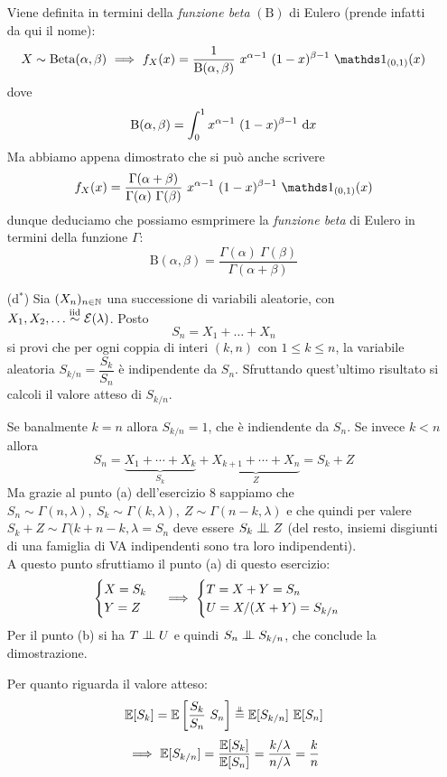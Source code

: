 \begin{enumerate}
\begin{oss}
Viene definita in termini della \emph{funzione beta} $(\mathrm{B})$ di Eulero (prende infatti da qui il nome):
\[
X\sim\text{Beta}(\alpha,\beta)\SE f_X(x)=\frac{1}{\mathrm{B}(\alpha,\beta)}\ x^{\alpha-1}\ (1-x)^{\beta-1}\ \Ind_{(0,1)}(x)
\]
dove
\[
\mathrm{B}(\alpha,\beta)=\int_0^1 x^{\alpha-1}\ (1-x)^{\beta-1}\dx
\]
Ma abbiamo appena dimostrato che si può anche scrivere
\[
f_X(x)=\frac{\Gamma(\alpha+\beta)}{\Gamma(\alpha)\ \Gamma(\beta)}\ x^{\alpha-1}\ (1-x)^{\beta-1}\ \Ind_{(0,1)}(x)
\]
dunque deduciamo che possiamo esmprimere la \emph{funzione beta} di Eulero in termini della funzione $\Gamma$:
\[
\mathrm{B}(\alpha,\beta)=\frac{\Gamma(\alpha)\ \Gamma(\beta)}{\Gamma(\alpha+\beta)}
\]
\end{oss}

\item [(d$^\ast$)] Sia $(X_n)_{n\in\mathbb{N}}$ una successione di variabili aleatorie, con $X_1,X_2,\dots\stackrel{\mathrm{iid}}{\sim}\mathcal{E}(\lambda)$. Posto
\[
S_n=X_1+\dots+X_n
\]
si provi che per ogni coppia di interi $(k,n)$ con $1\leq k\leq n$, la variabile aleatoria $S_{k/n}=\dfrac{S_k}{S_n}$ è indipendente da $S_n$. Sfruttando quest'ultimo risultato si calcoli il valore atteso di $S_{k/n}$.

Se banalmente $k=n$ allora $S_{k/n}=1$, che è indiendente da $S_{n}$. Se invece $k<n$ allora 
\[
S_n=\underbrace{X_1+\cdots+X_k}_{S_k}+\underbrace{X_{k+1}+\cdots+X_n}_{Z}=S_k+Z
\]
Ma grazie al punto (a) dell'esercizio 8 sappiamo che $S_n\sim\Gamma(n,\lambda),\ S_k\sim\Gamma(k,\lambda),\ Z\sim\Gamma(n-k,\lambda)$ e che quindi per valere $S_k+Z\sim\Gamma(k+n-k,\lambda=S_n$ deve essere $S_k\indep Z$ (del resto, insiemi disgiunti di una famiglia di VA indipendenti sono tra loro indipendenti). \\
A questo punto sfruttiamo il punto (a) di questo esercizio:
\[
\begin{cases}
X=S_k \\
Y=Z
\end{cases}
\ \Longrightarrow\ 
\begin{cases}
T=X+Y=S_n \\
U=X/(X+Y)=S_{k/n}
\end{cases}
\]
Per il punto (b) si ha $T\indep U$ e quindi $S_n\indep S_{k/n}$, che conclude la dimostrazione.

Per quanto riguarda il valore atteso:
\[
\EE[S_k]=\EE\left[\frac{S_k}{S_n}\ S_n   \right]\overset{\underset{\indep}{}}{=}\EE[S_{k/n}]\ \EE[S_n]
\]
\[
\ \Longrightarrow\  \mathbb{E}[S_{k/n}]=\frac{\mathbb{E}[S_k]}{\mathbb{E}[S_n]}=\frac{k/\lambda}{n/\lambda}=\frac{k}{n}
\]
\end{enumerate}

\Soluzione{} %

\Soluzione{} %

\Soluzione{} %

\Soluzione{} %

\Soluzione{} %

\Soluzione{} %

\Soluzione{} %

\Soluzione{} %

\Soluzione{} %

\Soluzione{} %

\Soluzione{} %

\Soluzione{} %

\Soluzione{} %